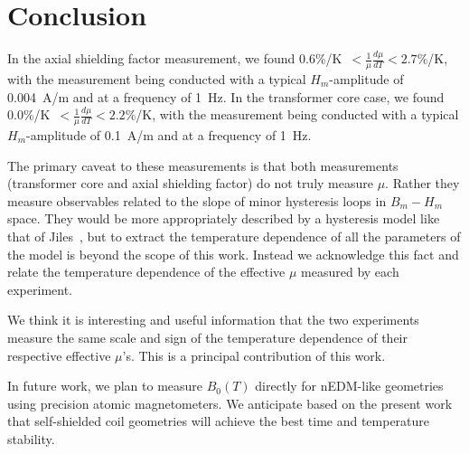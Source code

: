 \section{Conclusion}

In the axial shielding factor measurement, we found
0.6\%/K~$<\frac{1}{\mu}\frac{d\mu}{dT}<2.7\%$/K, with the measurement
being conducted with a typical $H_m$-amplitude of 0.004~A/m and at a
frequency of 1~Hz.  In the transformer core case, we found
0.0\%/K~$<\frac{1}{\mu}\frac{d\mu}{dT}<2.2\%$/K, with the measurement
being conducted with a typical $H_m$-amplitude of 0.1~A/m and at a
frequency of 1~Hz.

The primary caveat to these measurements is that both measurements
(transformer core and axial shielding factor) do not truly measure
$\mu$.  Rather they measure observables related to the slope of minor
hysteresis loops in $B_m-H_m$ space.  They would be more appropriately
described by a hysteresis model like that of Jiles~\cite{jiles},
but to extract the temperature dependence of all the parameters of the
model is beyond the scope of this work.  Instead we acknowledge this
fact and relate the temperature dependence of the effective $\mu$
measured by each experiment.

We think it is interesting and useful information that the two
experiments measure the same scale and sign of the temperature
dependence of their respective effective $\mu$'s.  This is a principal
contribution of this work.

In future work, we plan to measure $B_0(T)$ directly for nEDM-like
geometries using precision atomic magnetometers.  We anticipate based
on the present work that self-shielded coil geometries will achieve
the best time and temperature stability.










